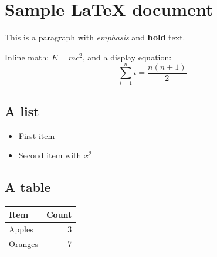 \section{Sample LaTeX document}

This is a paragraph with \emph{emphasis} and \textbf{bold} text.

Inline math: $E = mc^2$, and a display equation:
$$\sum_{i=1}^{n} i = \frac{n(n+1)}{2}$$

\subsection{A list}

\begin{itemize}
    \item First item
    \item Second item with $x^2$
\end{itemize}

\subsection{A table}

\begin{tabular}{|l|r|}
\hline
Item & Count \\
\hline
Apples & 3 \\
Oranges & 7 \\
\hline
\end{tabular}
